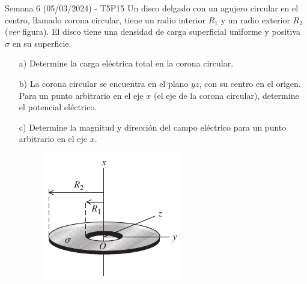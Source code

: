 \begin{frame}{Semana 6 (05/03/2024) - T5P15}
    \small
    Un disco delgado con un agujero circular en el centro, llamado corona circular, tiene un radio interior $R_1$ y un radio exterior $R_2$ (\textit{ver} figura). El disco tiene una densidad de carga superficial uniforme y positiva $\sigma$ en su superficie.

\begin{itemize}
    \item[a)] Determine la carga
eléctrica total en la corona circular.
\item[b)] La corona circular se encuentra
en el plano $yz$, con su centro en el
origen. Para un punto arbitrario en
el eje $x$ (el eje de la corona circular), determine el potencial eléctrico.
\item[c)] Determine la magnitud y dirección del campo eléctrico para un punto arbitrario en
el eje $x$.

\begin{figure}[H]
        \centering
        \includegraphics[scale=0.4]{figures/t5p15.png}
    \end{figure}

\end{itemize}
    
\end{frame}